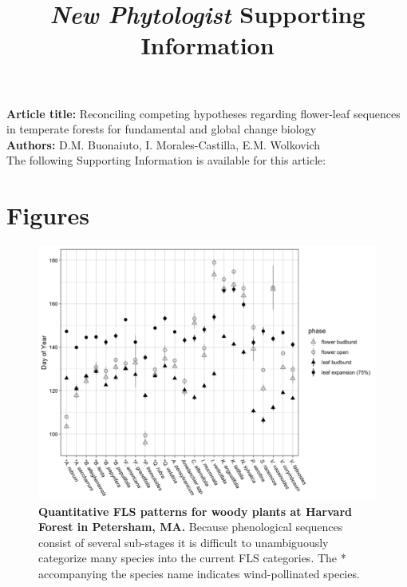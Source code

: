 \documentclass[11pt]{article}
\title{\textit{New Phytologist} Supporting Information}
\date{}
\begin{document}
\maketitle

\noindent \textbf{Article title:} Reconciling competing hypotheses regarding flower-leaf sequences in temperate forests for fundamental and global change biology\\
\noindent \textbf{Authors:} D.M. Buonaiuto, I. Morales-Castilla, E.M. Wolkovich\\

\noindent The following Supporting Information is available for this article:\\

\pagebreak[4]

\section*{Figures}
\begin{figure}[H]
    \centering
 \includegraphics[width=\textwidth]{..//..//HarvardForest/HFmeans_expanded.jpeg} 
    \caption{\textbf{Quantitative FLS patterns for woody plants at Harvard Forest in Petersham, MA.} Because phenological sequences consist of several sub-stages it is difficult to unambiguously categorize many species into the current FLS categories. The * accompanying the species name indicates wind-pollinated species.}
    \label{fig:HFmeans}
\end{figure}
\end{document}
